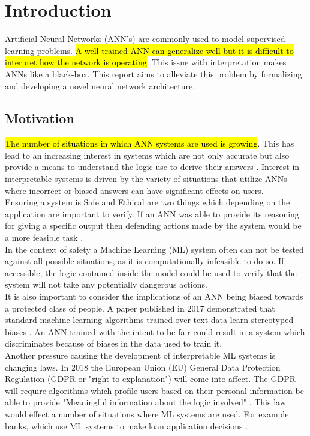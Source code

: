 \chapter{Introduction}\label{C:intro}

Artificial Neural Networks (ANN's) are commonly used to model supervised learning problems. \hl{A well trained ANN can generalize well but it is difficult to interpret how the network is operating}. This issue with interpretation makes ANNs like a black-box. This report aims to alleviate this problem by formalizing and developing a novel neural network architecture.

\section{Motivation}
\hl{The number of situations in which ANN systems are used is growing}. This has lead to an increasing interest in systems which are not only accurate but also provide a means to understand the logic use to derive their answers \cite{doshi2017towards}. Interest in interpretable systems is driven by the variety of situations that utilize ANNs where incorrect or biased answers can have significant effects on users.\\

Ensuring a system is Safe and Ethical are two things which depending on the application are important to verify. If an ANN was able to provide its reasoning for giving a specific output then defending actions made by the system would be a more feasible task \cite{doshi2017towards}.\\

In the context of safety a Machine Learning (ML) system often can not be tested against all possible situations, as it is computationally infeasible to do so. If accessible, the logic contained inside the model could be used to verify that the system will not take any potentially dangerous actions.\\

It is also important to consider the implications of an ANN being biased towards a protected class of people. A paper published in 2017 demonstrated that standard machine learning algorithms trained over text data learn stereotyped biases \cite{caliskan2017semantics}. An ANN trained with the intent to be fair could result in a system which discriminates because of biases in the data used to train it.\\

Another pressure causing the development of interpretable ML systems is changing laws. In 2018 the European Union (EU) General Data Protection Regulation (GDPR or "right to explanation") will come into affect. The GDPR will require algorithms which profile users based on their personal information be able to provide "Meaningful information about the logic involved"  \cite{eu-dgpr}. This law would effect a number of situations where ML systems are used. For example banks, which use ML systems to make loan application decisions \cite{goodman2016european}.\\

